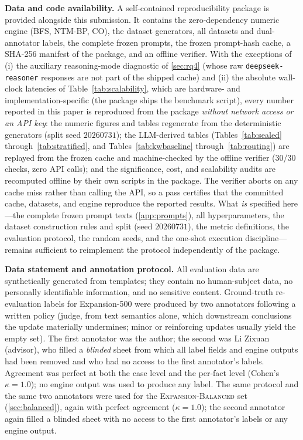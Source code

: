 \documentclass{article}
\theoremstyle{definition}
\begin{document}
\textbf{Data and code availability.}  A self-contained reproducibility
package is provided alongside this submission.  It contains the
zero-dependency numeric engine (BFS, NTM-BP, CO), the dataset generators,
all datasets and dual-annotator labels, the complete frozen prompts, the
frozen prompt-hash cache, a SHA-256 manifest of the package, and an
offline verifier.  With the exceptions of (i) the auxiliary reasoning-mode
diagnostic of \cref{sec:rq4} (whose raw \texttt{deepseek-reasoner}
responses are not part of the shipped cache) and (ii) the absolute
wall-clock latencies of Table~\ref{tab:scalability}, which are hardware- and
implementation-specific (the package ships the benchmark script), every
number reported in this paper is reproduced from the package
\emph{without network access or an API key}: the numeric figures and tables
regenerate from the deterministic generators (split seed $20260731$); the
LLM-derived tables (Tables~\ref{tab:sealed} through~\ref{tab:stratified},
and Tables~\ref{tab:kwbaseline} through~\ref{tab:routing}) are replayed
from the frozen cache and machine-checked by the offline verifier (30/30
checks, zero API calls); and the significance, cost, and scalability
audits are recomputed offline by their own scripts in the package.
The verifier aborts on any cache miss rather than calling the API, so a
pass certifies that the committed cache, datasets, and engine reproduce
the reported results.  What \emph{is} specified here---the complete frozen
prompt texts (\cref{app:prompts}), all hyperparameters, the dataset
construction rules and split (seed $20260731$), the metric definitions,
the evaluation protocol, the random seeds, and the one-shot execution
discipline---remains sufficient to reimplement the protocol independently
of the package.

\textbf{Data statement and annotation protocol.}  All evaluation data are
synthetically generated from templates; they contain no human-subject
data, no personally identifiable information, and no sensitive content.
Ground-truth re-evaluation labels for Expansion-500 were produced by two
annotators following a written policy (judge, from text semantics alone,
which downstream conclusions the update materially undermines; minor or
reinforcing updates usually yield the empty set).  The first annotator
was the author; the second was Li Zixuan (advisor), who filled a
\emph{blinded} sheet from which all label fields and engine outputs had
been removed and who had no access to the first annotator's labels.
Agreement was perfect at both the case level and the per-fact level
(Cohen's $\kappa=1.0$); no engine output was used to produce any label.
The same protocol and the same two annotators were used for the
\textsc{Expansion-Balanced} set (\cref{sec:balanced}), again with perfect
agreement ($\kappa=1.0$); the second annotator again filled a blinded
sheet with no access to the first annotator's labels or any engine
output.
\end{document}
